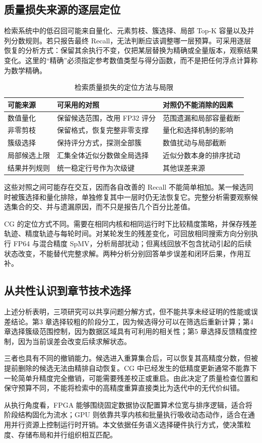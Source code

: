 \subsection{质量损失来源的逐层定位}
检索系统中的低召回可能来自量化、元素剪枝、簇选择、局部 Top-K 容量以及并列分数规则。若只报告最终 Recall，无法判断应该调整哪一层预算。可采用逐层恢复的分析方式：保留其余执行不变，仅把某层替换为精确或全量版本，观察结果变化。这里的“精确”必须指定参考数值类型与得分函数，而不是把任何浮点计算称为数学精确。

\begin{table}[htbp]\centering\caption{检索质量损失的定位方法与局限}
\begin{tabularx}{\textwidth}{p{2.2cm}XX}\toprule
可能来源&可采用的对照&对照仍不能消除的因素\\\midrule
数值量化&保留候选范围，改用 FP32 评分&范围遗漏和局部容量截断\\
非零剪枝&保留格式，恢复完整非零支撑&量化和选择机制的影响\\
簇级选择&保持评分方式，探测全部簇&数值扰动与局部截断\\
局部候选上限&汇集全体近似分数做全局选择&近似分数本身的排序扰动\\
结果并列规则&统一稳定行号作为次级键&其他误差来源\\\bottomrule
\end{tabularx}\end{table}

这些对照之间可能存在交互，因而各自改善的 Recall 不能简单相加。某一候选同时被簇选择和量化排除，单独修复其中一层时仍无法恢复它。完整分析需要观察候选集合的交、并与遗漏原因，而不只是报告几个百分比差值。

CG 的定位方式不同。需要在相同内核和相同运行时下比较精度策略，并保存残差轨迹、精度轨迹与每轮时间。对某轮发生的残差变化，可回放相同搜索方向分别执行 FP64 与混合精度 SpMV，分析局部扰动；但离线回放不包含扰动引起的后续状态改变，不能替代完整求解。两种分析分别回答单步误差和闭环后果，作用互补。

\subsection{从共性认识到章节技术选择}
上述分析表明，三项研究可以共享问题分解方式，但不能共享未经证明的性能或误差结论。第3 章选择较粗的阶段分工，因为候选得分可以在筛选后重新计算；第4 章选择簇级范围控制，因为数据区域具有可利用的相关性；第5 章选择反馈精度控制，因为当前误差会改变后续求解状态。

三者也具有不同的撤销能力。候选进入重算集合后，可以恢复其高精度分数，但被提前删除的候选无法由精排自动恢复。CG 中已经发生的低精度更新通常不能靠下一轮简单升精度完全撤销，可能需要残差校正或重启。由此决定了质量检查位置和保守预算不同，不能将检索中的高精度重算直接类比为迭代中的无代价纠错。

从执行角度看，FPGA 能够围绕固定数据协议配置算术位宽与排序逻辑，适合将阶段结构固化为流水；GPU 则依靠共享内核和批量执行吸收动态动作，适合在通用并行资源上控制运行时开销。本文依据任务语义选择硬件执行方式，使决策粒度、存储布局和并行组织相互匹配。

